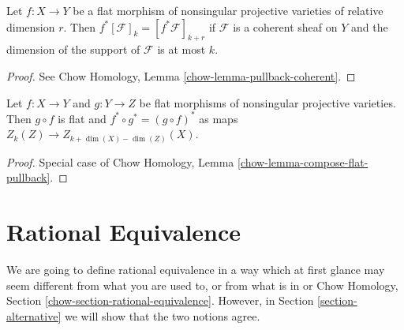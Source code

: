 \begin{lemma}
\label{lemma-pullback}
Let $f : X \to Y$ be a flat morphism of nonsingular projective varieties
of relative dimension $r$.
Then $f^*[\mathcal{F}]_k = [f^*\mathcal{F}]_{k + r}$
if $\mathcal{F}$ is a coherent sheaf on $Y$ and the dimension of the
support of $\mathcal{F}$ is at most $k$.
\end{lemma}

\begin{proof}
See Chow Homology, Lemma \ref{chow-lemma-pullback-coherent}.
\end{proof}

\begin{lemma}
\label{lemma-compose-flat-pullback}
Let $f : X \to Y$ and $g : Y \to Z$ be flat morphisms of
nonsingular projective varieties. Then $g \circ f$ is flat
and $f^* \circ g^* = (g \circ f)^*$
as maps $Z_k(Z) \to Z_{k + \dim(X) - \dim(Z)}(X)$.
\end{lemma}

\begin{proof}
Special case of Chow Homology, Lemma \ref{chow-lemma-compose-flat-pullback}.
\end{proof}


\section{Rational Equivalence}
\label{section-rational-equivalence}

\noindent
We are going to define rational equivalence in a way which at first
glance may seem different from what you are used to, or from what
is in \cite[Chapter I]{F} or
Chow Homology, Section \ref{chow-section-rational-equivalence}.
However, in Section \ref{section-alternative} we will show that
the two notions agree.

